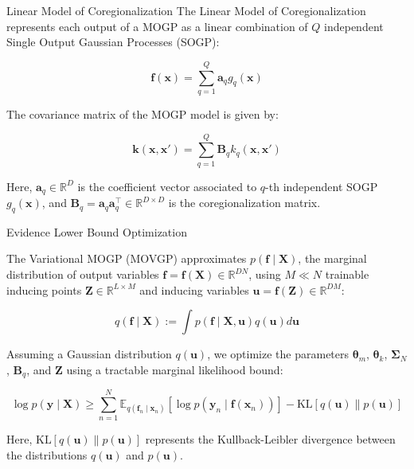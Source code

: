 \documentclass[10pt, xcolor=table]{beamer}
\begin{document}
\begin{frame}{Linear Model of Coregionalization}
    The Linear Model of Coregionalization represents each output of a MOGP as a linear combination of $Q$ independent Single Output Gaussian Processes (SOGP):
    
    \begin{equation*}
        \bm{f}(\mathbf{x}) = \sum_{q=1}^Q \mathbf{a}_{q}g_q(\mathbf{x})
    \end{equation*}
    
    The covariance matrix of the MOGP model is given by:
    
    \begin{equation*}\label{eq:MOGP_cov}
        \bm{k}(\mathbf{x}, \mathbf{x}') = \sum_{q=1}^Q \mathbf{B}_q k_q(\mathbf{x}, \mathbf{x}')
    \end{equation*}
    
    Here, $\mathbf{a}_{q} \in \mathbb{R}^D$ is the coefficient vector associated to $q$-th independent SOGP $g_q(\mathbf{x})$, and $\mathbf{B}_q = \mathbf{a}_{q}\mathbf{a}_{q}^\top \in \mathbb{R}^{D \times D}$ is the coregionalization matrix.
\end{frame}

\begin{frame}{Evidence Lower Bound Optimization}

The Variational MOGP (MOVGP) approximates $p(\mathbf{f} \mid \mathbf{X})$, the marginal distribution of output variables $\mathbf{f} = \bm{f}(\mathbf{X}) \in \mathbb{R}^{D N}$, using $M \ll N$ trainable inducing points $\mathbf{Z} \in \mathbb{R}^{L\times M}$ and inducing variables $\mathbf{u} = \bm{f}(\mathbf{Z}) \in \mathbb{R}^{DM}$:

\begin{equation*}\label{prior_aproximation}
    q(\mathbf{f} \mid \mathbf{X}) := \int p(\mathbf{f} \mid \mathbf{X}, \mathbf{u}) q(\mathbf{u}) d\mathbf{u}
\end{equation*}

Assuming a Gaussian distribution $q(\mathbf{u})$, we optimize the parameters $\bm{\theta}_m$, $\bm{\theta}_k$, $\mathbf{\Sigma}_N$, $\mathbf{B}_q$, and $\mathbf{Z}$ using a tractable marginal likelihood bound:

\begin{equation*}\label{marginal_likelihood_bound}
    \log p(\mathbf{y} \mid \mathbf{X}) \geq \sum_{n=1}^N \mathbb{E}_{q(\bm{f}_n \mid \mathbf{x}_n)}[\log p(\bm{y}_n \mid \bm{f}(\mathbf{x}_n))] - \text{KL}[q(\mathbf{u})\parallel p(\mathbf{u})]
\end{equation*}

Here, $\text{KL}[q(\mathbf{u})\parallel p(\mathbf{u})]$ represents the Kullback-Leibler divergence between the distributions $q(\mathbf{u})$ and $p(\mathbf{u})$.
\end{frame}
\end{document}
